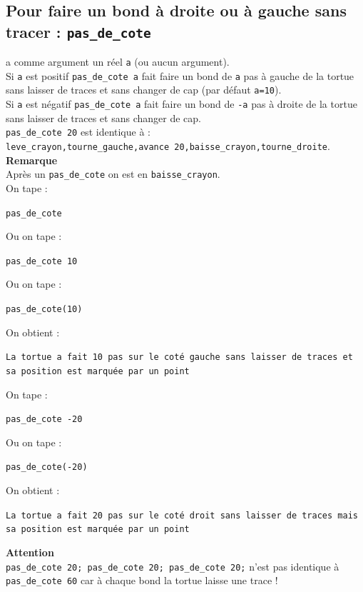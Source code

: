 \documentclass[a4paper,11pt]{book}
\begin{document}
\subsection{Pour faire un bond \`a droite ou \`a gauche sans tracer : {\tt pas\_de\_cote}}
 a comme argument un r\'eel {\tt a}
(ou aucun argument).\\
Si {\tt a} est positif {\tt pas\_de\_cote a} fait faire un bond de {\tt a} pas 
\`a gauche de la tortue sans laisser de traces et sans changer de cap 
(par d\'efaut {\tt a=10}).\\
Si {\tt a} est n\'egatif {\tt pas\_de\_cote a} fait faire un bond de {\tt -a} 
pas \`a droite de la tortue sans laisser de traces et sans changer de cap.\\
{\tt pas\_de\_cote 20} est identique \`a  :\\
{\tt leve\_crayon,tourne\_gauche,avance 20,baisse\_crayon,tourne\_droite}.\\
{\bf Remarque} \\
Apr\`es un {\tt pas\_de\_cote} on est en {\tt baisse\_crayon}.\\
On tape :
\begin{center}{\tt pas\_de\_cote}\end{center}
Ou on tape :
\begin{center}{\tt pas\_de\_cote 10}\end{center}
Ou on tape :
\begin{center}{\tt pas\_de\_cote(10)}\end{center}
On obtient :
\begin{center}{\tt La tortue a fait 10 pas sur le cot\'e gauche sans laisser de
traces et sa position est marqu\'ee par un point}\end{center}
On tape :
\begin{center}{\tt pas\_de\_cote -20}\end{center}
Ou on tape :
\begin{center}{\tt pas\_de\_cote(-20)}\end{center}
On obtient :
\begin{center}{\tt La tortue a fait 20 pas sur le cot\'e droit sans laisser de 
traces mais sa position est marqu\'ee par un point}\end{center}
{\bf Attention}\\
{\tt pas\_de\_cote 20; pas\_de\_cote 20; pas\_de\_cote 20;} n'est pas identique
 \`a {\tt pas\_de\_cote 60} car \`a chaque bond la tortue laisse une trace !
\end{document}
